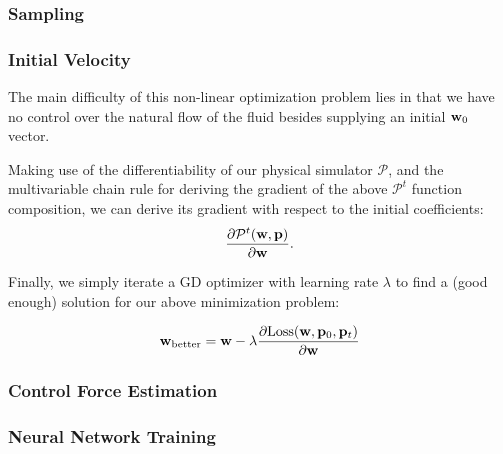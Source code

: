 \subsubsection*{Sampling}



\subsubsection{Initial Velocity}

The main difficulty of this non-linear optimization problem lies in that we have
no control over the natural flow of the fluid besides supplying an initial
$\vb{w}_0$ vector.

Making use of the differentiability of our physical simulator $\mathcal{P}$, and
the multivariable chain rule for deriving the gradient of the above
$\mathcal{P}^t$ function composition, we can derive its gradient with respect to
the initial coefficients: $$\frac{\partial
\mathcal{P}^t(\vb{w},\vb{p})}{\partial \vb{w}}.$$

Finally, we simply iterate a \ac{GD} optimizer with learning rate $\lambda$ to
find a (good enough) solution for our above minimization problem:

$$\vb{w}_{\text{better}} = \vb{w} - \lambda
\frac{
    \partial\text{Loss}(\vb{w}, \vb{p}_0, \vb{p}_t)
}{
    \partial \vb{w}
}$$
\subsubsection{Control Force Estimation}

\subsubsection{Neural Network Training}
